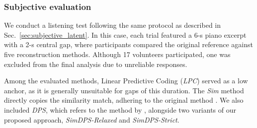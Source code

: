 \documentclass{article}
\begin{document}






\vspace{-5pt}
\subsubsection{Subjective evaluation}
\vspace{-3pt}

We conduct a listening test following the same protocol as described in Sec.~\ref{sec:subjective_latent}. In this case, each trial featured a 6-s piano excerpt with a 2-s central gap, where participants compared the original reference against five reconstruction methods. Although 17 volunteers participated, one was excluded from the final analysis due to unreliable responses.

Among the evaluated methods, Linear Predictive Coding (\textit{LPC}) \cite{kauppinen_audio_2002} served as a low anchor, as it is generally unsuitable for gaps of this duration.
The \textit{Sim} method directly copies the similarity match, adhering to the original method \cite{perraudin_inpainting_2018}.
We also included \textit{DPS}, which refers to the method by \cite{moliner_diffusion-based_2024}, alongside two variants of our proposed approach, \textit{SimDPS-Relaxed} and \textit{SimDPS-Strict}.
\end{document}
